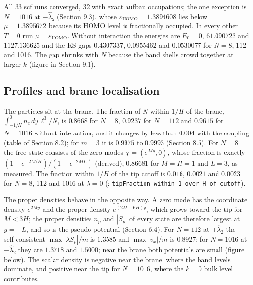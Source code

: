 \documentclass[11pt]{article}
\begin{document}
All 33 scf runs converged, 32 with exact aufbau occupations; the one exception is $N=1016$ at $-\hat\lambda_2$ (Section 9.3), whose $\varepsilon_{\mathrm{HOMO}}=1.3894608$ lies below $\mu=1.3895672$ because its HOMO level is fractionally occupied. In every other $T=0$ run $\mu=\varepsilon_{\mathrm{HOMO}}$. Without interaction the energies are $E_0=0$, $61.090723$ and $1127.136625$ and the KS gaps $0.4307337$, $0.0955462$ and $0.0530077$ for $N=8$, 112 and 1016. The gap shrinks with $N$ because the band shells crowd together at larger $k$ (figure in Section 9.1).

\subsection{Profiles and brane localisation}

The particles sit at the brane. The fraction of $N$ within $1/H$ of the brane, $\int_{-1/H}^0n_c\,dy\,\ell^3/N$, is $0.8668$ for $N=8$, $0.9237$ for $N=112$ and $0.9615$ for $N=1016$ without interaction, and it changes by less than $0.004$ with the coupling (table of Section 8.2); for $m=3$ it is $0.9975$ to $0.9993$ (Section 8.5). For $N=8$ the free state consists of the zero modes $\chi=(e^{My},0)$, whose fraction is exactly $(1-e^{-2M/H})/(1-e^{-2ML})$ (derived), $0.86681$ for $M=H=1$ and $L=3$, as measured. The fraction within $1/H$ of the tip cutoff is $0.016$, $0.0021$ and $0.0023$ for $N=8$, 112 and 1016 at $\lambda=0$ (\texttt{}: \texttt{tipFract\allowbreak{}ion\_with\allowbreak{}in\_1\_ove\allowbreak{}r\_H\_of\_c\allowbreak{}utoff}).

The proper densities behave in the opposite way. A zero mode has the coordinate density $e^{2My}$ and the proper density $e^{(2M-6H)y}$, which grows toward the tip for $M<3H$; the proper densities $n_p$ and $|S_p|$ of every state are therefore largest at $y=-L$, and so is the pseudo-potential (Section 6.4). For $N=112$ at $+\hat\lambda_2$ the self-consistent $\max|\lambda S_p|/m$ is $1.3585$ and $\max|v_x|/m$ is $0.8927$; for $N=1016$ at $-\hat\lambda_2$ they are $1.3718$ and $1.5000$; near the brane both potentials are small (figure below). The scalar density is negative near the brane, where the band levels dominate, and positive near the tip for $N=1016$, where the $k=0$ bulk level contributes.
\end{document}
